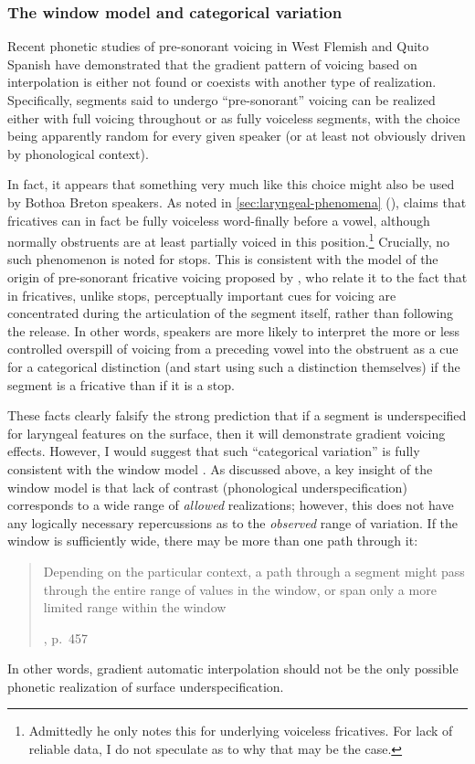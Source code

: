 \subsubsection{The window model and categorical variation}
\label{sec:wind-model-accomm}

Recent phonetic studies of pre\hyp sonorant voicing in West Flemish \citep{strycharczuk11:_explain} and Quito Spanish \citep{strycharczuk11:_phonet} have demonstrated that the gradient pattern of voicing based on interpolation is either not found or coexists with another type of realization. Specifically, segments said to undergo \enquote{pre\hyp sonorant} voicing can be realized either with full voicing throughout or as fully voiceless segments, with the choice being apparently random for every given speaker (or at least not obviously driven by phonological context).

In fact, it appears that something very much like this choice might also be used by Bothoa Breton speakers. As noted in \cref{sec:laryngeal-phenomena} (), \citet{humphreys95:_phonol_bothoa_saint_nicol_pelem} claims that fricatives can in fact be fully voiceless word-finally before a vowel, although normally obstruents are at least partially voiced in this position.\footnote{Admittedly he only notes this for underlying voiceless fricatives. For lack of reliable data, I do not speculate as to why that may be the case.} Crucially, no such phenomenon is noted for stops. This is consistent with the model of the origin of pre\hyp sonorant fricative voicing proposed by \citet{strycharczuk11:_explain}, who relate it to the fact that in fricatives, unlike stops, perceptually important cues for voicing are concentrated during the articulation of the segment itself, rather than following the release. In other words, speakers are more likely to interpret the more or less controlled overspill of voicing from a preceding vowel into the obstruent \citep{westbury86:_natur_stop_conson_voicin} as a cue for a categorical distinction (and start using such a distinction themselves) if the segment is a fricative than if it is a stop.

These facts clearly falsify the strong prediction that if a segment is underspecified for laryngeal features on the surface, then it will demonstrate gradient voicing effects. However, I would suggest that such \enquote{categorical variation} is fully consistent with the window model \citep{keating88,keating90}. As discussed above, a key insight of the window model is that lack of contrast (\ie phonological underspecification) corresponds to a wide range of \emph{allowed} realizations; however, this does not have any logically necessary repercussions as to the \emph{observed} range of variation. If the window is sufficiently wide, there may be more than one path through it: \blockquote[\citealp{keating90}, p.~457][.]{Depending on the particular context, a path through a segment might pass through the entire range of values in the window, or span only a more limited range within the window}. In other words, gradient automatic interpolation should not be the only possible phonetic realization of surface underspecification.


